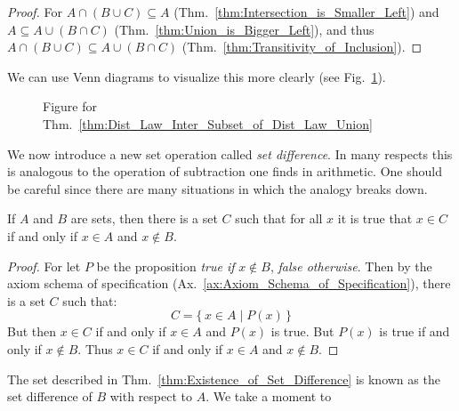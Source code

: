         \begin{proof}
            For $A\cap(B\cup{C})\subseteq{A}$
            (Thm.~\ref{thm:Intersection_is_Smaller_Left}) and
            $A\subseteq{A}\cup(B\cap{C})$ (Thm.~\ref{thm:Union_is_Bigger_Left}),
            and thus $A\cap(B\cup{C})\subseteq{A}\cup(B\cap{C})$
            (Thm.~\ref{thm:Transitivity_of_Inclusion}).
        \end{proof}
        We can use Venn diagrams to visualize this more clearly (see
        Fig.~\ref{fig:Venn_Diagram_Compare_Dist_Laws_Unions_Intersections}).
        \begin{figure}[H]
            \centering
            \captionsetup{type=figure}
            
            \caption{Figure for
                     Thm.~\ref{thm:Dist_Law_Inter_Subset_of_Dist_Law_Union}}
            \label{fig:Venn_Diagram_Compare_Dist_Laws_Unions_Intersections}
        \end{figure}
        We now introduce a new set operation called
        \textit{set difference}. In many respects this is
        analogous to the operation of subtraction one finds in arithmetic. One
        should be careful since there are many situations in which the analogy
        breaks down.
        \begin{theorem}
            \label{thm:Existence_of_Set_Difference}%
            If $A$ and $B$ are sets, then there is a set $C$ such that for all
            $x$ it is true that $x\in{C}$ if and only if $x\in{A}$ and
            $x\notin{B}$.
        \end{theorem}
        \begin{proof}
            For let $P$ be the proposition \textit{true if} $x\notin{B}$,
            \textit{false otherwise}. Then by the axiom schema of specification
            (Ax.~\ref{ax:Axiom_Schema_of_Specification}), there is a set $C$
            such that:
            \begin{equation}
                C=\{\,x\in{A}\;|\;P(x)\,\}
            \end{equation}
            But then $x\in{C}$ if and only if $x\in{A}$ and $P(x)$ is true.
            But $P(x)$ is true if and only if $x\notin{B}$. Thus $x\in{C}$ if
            and only if $x\in{A}$ and $x\notin{B}$.
        \end{proof}
        The set described in Thm.~\ref{thm:Existence_of_Set_Difference} is known
        as the set difference of $B$ with respect to $A$. We take a moment to
